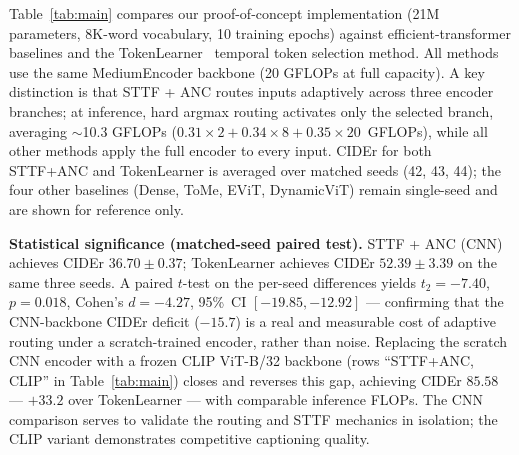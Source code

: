 \documentclass{article}
\begin{document}
Table~\ref{tab:main} compares our proof-of-concept implementation (21M parameters, 8K-word vocabulary, 10 training epochs) against efficient-transformer baselines and the TokenLearner~\cite{ryoo2021tokenlearner} temporal token selection method.
All methods use the same MediumEncoder backbone (20 GFLOPs at full capacity).
A key distinction is that STTF + ANC routes inputs adaptively across three encoder branches; at inference, hard argmax routing activates only the selected branch, averaging $\sim$10.3 GFLOPs ($0.31{\times}2 + 0.34{\times}8 + 0.35{\times}20$~GFLOPs), while all other methods apply the full encoder to every input.
CIDEr for both STTF+ANC and TokenLearner is averaged over matched seeds (42, 43, 44); the four other baselines (Dense, ToMe, EViT, DynamicViT) remain single-seed and are shown for reference only.

\textbf{Statistical significance (matched-seed paired test).}
STTF + ANC (CNN) achieves CIDEr $36.70 \pm 0.37$; TokenLearner achieves CIDEr $52.39 \pm 3.39$ on the same three seeds. A paired $t$-test on the per-seed differences yields $t_{2}{=}{-}7.40$, $p{=}0.018$, Cohen's $d{=}{-}4.27$, 95\%~CI $[-19.85, -12.92]$ — confirming that the CNN-backbone CIDEr deficit ($-15.7$) is a real and measurable cost of adaptive routing under a scratch-trained encoder, rather than noise. Replacing the scratch CNN encoder with a frozen CLIP ViT-B/32 backbone (rows ``STTF+ANC, CLIP'' in Table~\ref{tab:main}) closes and reverses this gap, achieving CIDEr $85.58$ — $+33.2$ over TokenLearner — with comparable inference FLOPs. The CNN comparison serves to validate the routing and STTF mechanics in isolation; the CLIP variant demonstrates competitive captioning quality.
\end{document}
